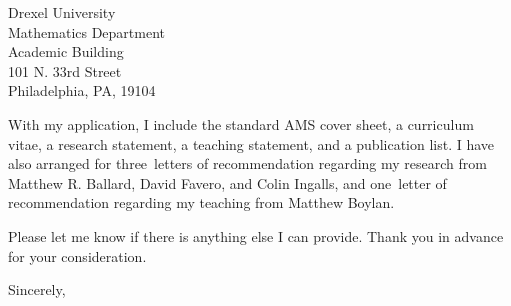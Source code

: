 \documentclass[12pt]{letter}
\def\MSPRF{As requested in the posting, I have applied for an NSF Mathematical Sciences Postdoctoral Fellowship.
  If awarded, I plan to use it to carry out the proposed research laid out in my research statement at the University of Glasgow under the direction of Michael Wemyss.}
\def\materials{the standard AMS cover sheet,
  a curriculum vitae,
  a research statement,
  a teaching statement,
  and a publication list}
\def\contacts{Patrick Clarke}
\def\numresrefs{three}
\def\numteachrefs{one}
\def\refs{Matthew R. Ballard, David Favero, and Colin Ingalls}
\def\teachingrefs{Matthew Boylan}
\begin{document}
\begin{letter}{
    Drexel University\\
    Mathematics Department\\
    Academic Building\\
    101 N. 33rd Street\\
    Philadelphia, PA, 19104
}


  With my application, I include \materials.
  I have also arranged for \numresrefs\  letters of recommendation regarding my research from \refs, and \numteachrefs\ letter of recommendation regarding my teaching from \teachingrefs.

  
  Please let me know if there is anything else I can provide.
  Thank you in advance for your consideration.
  \closing{Sincerely,}
\end{letter}
\end{document}
